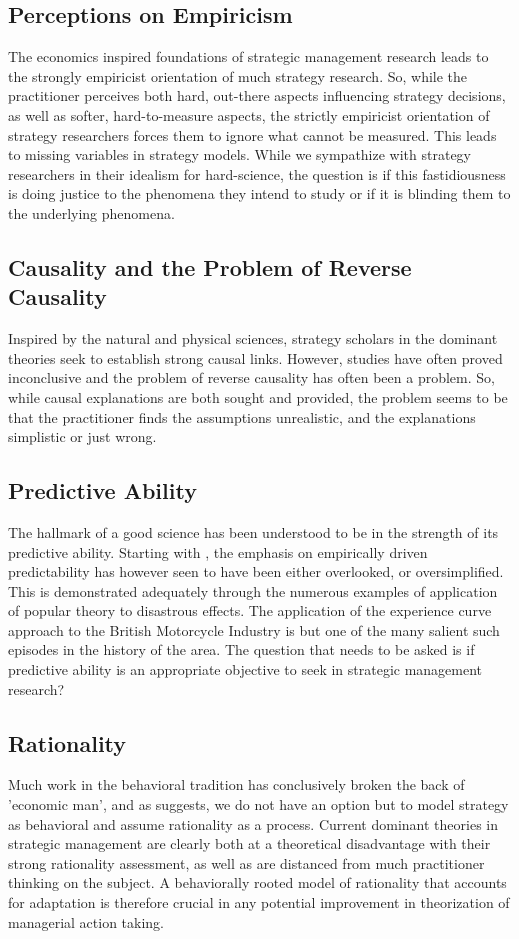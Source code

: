 \documentclass[12pt,letterpaper]{article}
\begin{document}
\subsection{Perceptions on Empiricism}
The economics inspired foundations of strategic management research leads to the strongly empiricist orientation of much strategy research. So, while the practitioner perceives both hard, out-there aspects influencing strategy decisions, as well as softer, hard-to-measure aspects, the strictly empiricist orientation of strategy researchers forces them to ignore what cannot be measured. This leads to missing variables in strategy models. While we sympathize with strategy researchers in their idealism for hard-science, the question is if this fastidiousness is doing justice to the phenomena they intend to study or if it is blinding them to the underlying phenomena.

\subsection{Causality and the Problem of Reverse Causality}
Inspired by the natural and physical sciences, strategy scholars in the dominant theories seek to establish strong causal links. However, studies have often proved inconclusive and the problem of reverse causality has often been a problem. So, while causal explanations are both sought and provided, the problem seems to be that the practitioner finds  the assumptions unrealistic, and the explanations simplistic or just wrong.

\subsection{Predictive Ability}
The hallmark of a good science has been understood to be in the strength of its predictive ability. Starting with \cite{Porter1980}, the emphasis on empirically driven predictability has however seen to have been either overlooked, or oversimplified. This is demonstrated adequately through the numerous examples of application of popular theory to disastrous effects. The application  of the experience curve approach to  the British Motorcycle Industry is but  one of the many salient such episodes in the history of the area. The question that needs to be asked is if predictive ability is an appropriate objective to seek in strategic management research?

\subsection{Rationality}
Much work in the behavioral tradition has conclusively broken the back of 'economic man', and as \cite{Levinthal2011} suggests, we do not have an option but to model strategy as behavioral and assume rationality as a process. Current dominant theories in strategic management are clearly both at a theoretical disadvantage with their strong rationality assessment, as well as are distanced from much practitioner thinking on the subject. A behaviorally rooted model of rationality that accounts for adaptation is therefore crucial in any potential improvement in theorization of managerial action taking.
\end{document}
